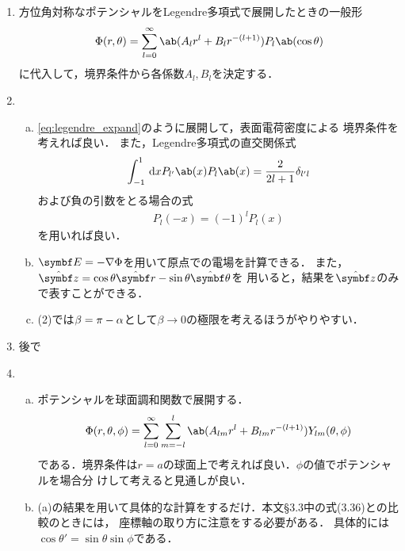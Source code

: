 \begin{enumerate}[label={\large 3.\arabic*}]
  \item 方位角対称なポテンシャルをLegendre多項式で展開したときの一般形
    \begin{gather}%
      \label{eq:legendre_expand}
      \Phi(r,\theta) = \sum_{l=0}^\infty \ab(A_l r^l + B_l r^{-(l+1)}) P_l\ab(\cos\theta)
    \end{gather}%
    に代入して，境界条件から各係数$A_l ,B_l$を決定する．
  \item 
    \begin{enumerate}[(a)]%
      \item  
        \eqref{eq:legendre_expand}のように展開して，表面電荷密度による
        境界条件を考えれば良い．
        また，Legendre多項式の直交関係式
        \begin{gather}%
          \label{eq:legendre_ortho}
          \int_{-1}^1 \dl{x} P_{l'}\ab(x) P_l\ab(x) = \frac{2}{2l+1} \delta_{l'l}
        \end{gather}%
        および負の引数をとる場合の式
        \begin{gather}%
          P_l(-x) =  (-1)^l P_l(x)
        \end{gather}%
        を用いれば良い．
      \item $\bs{E} = -\gr \Phi$を用いて原点での電場を計算できる．
        また，$\hat{\bs{z}} = \cos\theta \hat{\bs{r}} - \sin\theta \hat{\bs{\theta}}$を
        用いると，結果を$\hat{\bs{z}}$のみで表すことができる．
      \item (2)では$\beta = \pi - \alpha$として$\beta \to 0$の極限を考えるほうがやりやすい．
    \end{enumerate}
  \item 後で
  \item 
    \begin{enumerate}[(a)]%
      \item  ポテンシャルを球面調和関数で展開する．
        \begin{gather}%
          \Phi(r,\theta,\phi) = \sum_{l=0}^\infty \sum_{m=-l}^{l} \ab(A_{lm} r^l + B_{lm}r^{-(l+1)}) Y_{lm}(\theta,\phi)
        \end{gather}%
        である．境界条件は$r=a$の球面上で考えれば良い．$\phi$の値でポテンシャルを場合分
        けして考えると見通しが良い．
      \item (a)の結果を用いて具体的な計算をするだけ．本文\S3.3中の式(3.36)との比較のときには，
        座標軸の取り方に注意をする必要がある．
        具体的には$\cos\theta' = \sin\theta \sin\phi$である．

\end{enumerate}
\end{enumerate}
